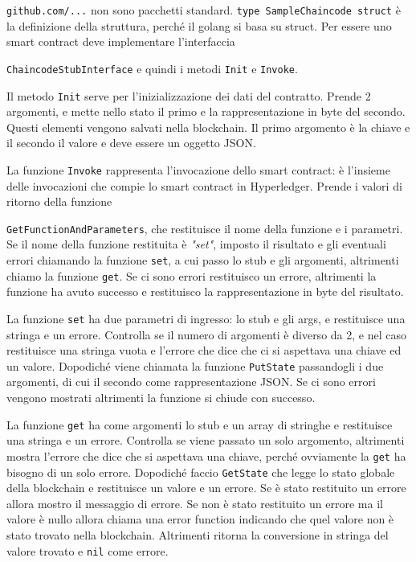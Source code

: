 \texttt{github.com/...} non sono pacchetti standard. \texttt{type SampleChaincode struct} è la definizione della struttura, perché il golang si basa su struct. Per essere uno smart contract deve implementare l'interfaccia 

\texttt{ChaincodeStubInterface} e quindi i metodi \texttt{Init} e \texttt{Invoke}. 

Il metodo \texttt{Init} serve per l'inizializzazione dei dati del contratto. Prende 2 argomenti, e mette nello stato il primo e la rappresentazione in byte del secondo. Questi elementi vengono salvati nella blockchain. Il primo argomento è la chiave e il secondo il valore e deve essere un oggetto JSON. 

La funzione \texttt{Invoke} rappresenta l'invocazione dello smart contract: è l'insieme delle invocazioni che compie lo smart contract in Hyperledger. Prende i valori di ritorno della funzione 

\texttt{GetFunctionAndParameters}, che restituisce il nome della funzione e i parametri. Se il nome della funzione restituita è \textit{"set"}, imposto il risultato e gli eventuali errori chiamando la funzione \texttt{set}, a cui passo lo stub e gli argomenti, altrimenti chiamo la funzione \texttt{get}. Se ci sono errori restituisco un errore, altrimenti la funzione ha avuto successo e restituisco la rappresentazione in byte del risultato.

La funzione \texttt{set} ha due parametri di ingresso: lo stub e gli args, e restituisce una stringa e un errore. Controlla se il numero di argomenti è diverso da 2, e nel caso restituisce una stringa vuota e l'errore che dice che ci si aspettava una chiave ed un valore. Dopodiché viene chiamata la funzione \texttt{PutState} passandogli i due argomenti, di cui il secondo come rappresentazione JSON. Se ci sono errori vengono mostrati altrimenti la funzione si chiude con successo. 

La funzione \texttt{get} ha come argomenti lo stub e un array di stringhe e restituisce una stringa e un errore. Controlla se viene passato un solo argomento, altrimenti mostra l'errore che dice che si aspettava una chiave, perché ovviamente la \texttt{get} ha bisogno di un solo errore. Dopodiché faccio \texttt{GetState} che legge lo stato globale della blockchain e restituisce un valore e un errore. Se è stato restituito un errore allora mostro il messaggio di errore. Se non è stato restituito un errore ma il valore è nullo allora chiama una error function indicando che quel valore non è stato trovato nella blockchain. Altrimenti ritorna la conversione in stringa del valore trovato e \texttt{nil} come errore. 

